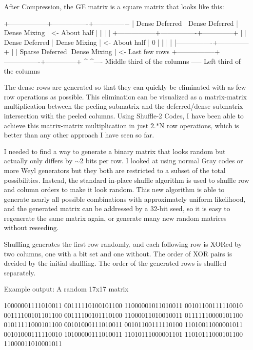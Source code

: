 After Compression, the GE matrix is a square matrix that looks like this\+: \begin{DoxyVerb}+-----------------+----------------+--------------+
|  Dense Deferred | Dense Deferred | Dense Mixing | <- About half
|                 |                |              |
+-----------------+----------------+--------------+
|                 | Dense Deferred | Dense Mixing | <- About half
|        0        |                |              |
|                 |----------------+--------------+
|                 | Sparse Deferred| Dense Mixing | <- Last few rows
+-----------------+----------------+--------------+
         ^                  ^---- Middle third of the columns
         \------ Left third of the columns
\end{DoxyVerb}


The dense rows are generated so that they can quickly be eliminated with as few row operations as possible. This elimination can be visualized as a matrix-\/matrix multiplication between the peeling submatrix and the deferred/dense submatrix intersection with the peeled columns. Using Shuffle-\/2 Codes, I have been able to achieve this matrix-\/matrix multiplication in just 2.$\ast$N row operations, which is better than any other approach I have seen so far.

I needed to find a way to generate a binary matrix that looks random but actually only differs by $\sim$2 bits per row. I looked at using normal Gray codes or more Weyl generators but they both are restricted to a subset of the total possibilities. Instead, the standard in-\/place shuffle algorithm is used to shuffle row and column orders to make it look random. This new algorithm is able to generate nearly all possible combinations with approximately uniform likelihood, and the generated matrix can be addressed by a 32-\/bit seed, so it is easy to regenerate the same matrix again, or generate many new random matrices without reseeding.

Shuffling generates the first row randomly, and each following row is X\+O\+Red by two columns, one with a bit set and one without. The order of X\+OR pairs is decided by the initial shuffling. The order of the generated rows is shuffled separately.

Example output\+: A random 17x17 matrix \begin{DoxyVerb}10000001111010011
00111110100101100
11000001011010011
00101100111110010
00111100101101100
00111100101110100
11000011010010011
01111110000101100
01011111000101100
00101000111010011
00101100111110100
11010011000001011
00101000111110010
10100000111010011
11010111000001101
11010111000101100
11000011010001011
\end{DoxyVerb}


